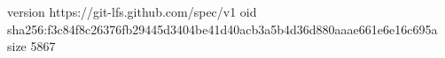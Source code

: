 version https://git-lfs.github.com/spec/v1
oid sha256:f3c84f8c26376fb29445d3404be41d40acb3a5b4d36d880aaae661e6e16c695a
size 5867
